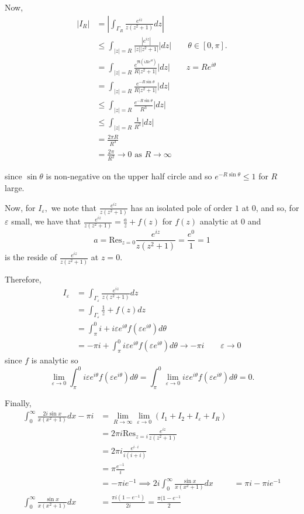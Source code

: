 \documentclass[12pt]{Homework}
\newcommand{\res}{\text{Res}}
\begin{document}
\begin{solution}
Now, \begin{align*}
    |I_R|&=\left|\int_{\Gamma_R}\frac{e^{iz}}{z(z^2+1)}dz\right|\\
    &\le\int_{|z|=R}\frac{|e^{iz}|}{|z||z^2+1|}|dz|\qquad \theta\in[0,\pi].\\
    &=\int_{|z|=R}\frac{e^{\Re(iRe^{i\theta})}}{R|z^2+1|}|dz|\qquad z=Re^{i\theta}\\
    &=\int_{|z|=R}\frac{e^{-R\sin\theta}}{R|z^2+1|}|dz|\\
    &\le\int_{|z|=R}\frac{e^{-R\sin\theta}}{R^3}|dz|\\
    &\le \int_{|z|=R}\frac{1}{R^3}|dz|\\
    &=\frac{2\pi R}{R^3}\\
    &=\frac{2\pi}{R^2}\to0\text{ as }R\to\infty
\end{align*}

since $\sin\theta$ is non-negative on the upper half circle and so $e^{-R\sin\theta}\le1$ for $R$ large.  

Now, for $I_\varepsilon,$ we note that $\frac{e^{iz}}{z(z^2+1)}$ has an isolated pole of order $1$ at $0$, and so, for $\varepsilon$ small, we have that $\frac{e^{iz}}{z(z^2+1)}=\frac{a}{z}+f(z)$ for $f(z)$ analytic at $0$ and $$a=\res_{z=0}\frac{e^{iz}}{z(z^2+1)}=\frac{e^{0}}{1}=1$$ is the reside of $\frac{e^{iz}}{z(z^2+1)}$ at $z=0.$

Therefore, \begin{align*}
    I_\varepsilon&=\int_{\Gamma_\varepsilon}\frac{e^{iz}}{z(z^2+1)}dz\\
    &=\int_{\Gamma_\varepsilon}\frac{1}{z}+f(z)dz\\
    &=\int_\pi^0i+i\varepsilon e^{i\theta}f(\varepsilon e^{i\theta})d\theta\\
    &=-\pi i+\int_\pi^0i\varepsilon e^{i\theta}f(\varepsilon e^{i\theta})d\theta\to-\pi i\qquad\varepsilon\to0
\end{align*}  since $f$ is analytic so $$\lim_{\varepsilon\to0}\int_\pi^0i\varepsilon e^{i\theta}f(\varepsilon e^{i\theta})d\theta=\int_\pi^0\lim_{\varepsilon\to0}i\varepsilon e^{i\theta}f(\varepsilon e^{i\theta})d\theta=0.$$

Finally, \begin{align*}
    \int_0^\infty\frac{2i\sin x}{x(x^2+1)}dx-\pi i&=\lim_{R\to\infty}\lim_{\varepsilon\to 0}(I_1+I_2+I_\varepsilon+I_R)\\
    &=2\pi i \res_{z=i}\frac{e^{iz}}{z(z^2+1)}\\
    &=2\pi i\frac{e^{i\cdot i}}{i(i+i)}\\
    &=\pi \frac{e^{-1}}{i}\\
    &=-\pi i e^{-1}
    \implies 2i\int_0^\infty\frac{\sin x}{x(x^2+1)}dx&=\pi i-\pi ie^{-1}\\
    \int_0^\infty\frac{\sin x}{x(x^2+1)}dx&=\frac{\pi i(1-e^{-1})}{2i}=\frac{\pi(1-e^{-1}}{2}
\end{align*}
\end{solution}
\newpage
\end{document}
